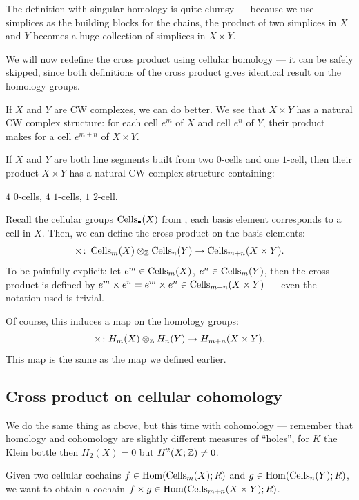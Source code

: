 The definition with singular homology is quite clumsy ---
because we use simplices as the building blocks for the chains,
the product of two simplices in $X$ and $Y$ becomes a huge collection of simplices in $X \times Y$.

We will now redefine the cross product using cellular homology ---
it can be safely skipped, since both definitions of the cross product gives identical result on the
homology groups.

If $X$ and $Y$ are CW complexes, we can do better.
We see that $X \times Y$ has a natural CW complex structure: for each cell $e^m$ of $X$ and cell
$e^n$ of $Y$, their product makes for a cell $e^{m + n}$ of $X \times Y$.

\begin{example}
	If $X$ and $Y$ are both line segments built from
	two $0$-cells and one $1$-cell, then their product $X \times Y$ has a natural CW complex
	structure containing:
	\begin{itemize}
		\ii $4$ $0$-cells,
		\ii $4$ $1$-cells,
		\ii $1$ $2$-cell.
	\end{itemize}
\end{example}

Recall the cellular groups $\operatorname{Cells}_\bullet(X)$ from , each basis element
corresponds to a cell in $X$.
Then, we can define the cross product on the basis elements:
\[ \times \colon \operatorname{Cells}_m(X) \otimes_\mathbb Z \operatorname{Cells}_n(Y) \to \operatorname{Cells}_{m + n}(X \times Y). \]
To be painfully explicit:
let $e^m \in \operatorname{Cells}_m(X)$, $e^n \in \operatorname{Cells}_m(Y)$, then the cross product is defined by $e^m \times
e^n = e^m \times e^n \in \operatorname{Cells}_{m + n}(X \times Y)$ --- even the notation used is trivial.

Of course, this induces a map on the homology groups:
\[ \times \colon H_m(X) \otimes_\mathbb Z H_n(Y) \to H_{m + n}(X \times Y). \]
This map is the same as the map we defined earlier.

\subsection{Cross product on cellular cohomology}

We do the same thing as above, but this time with cohomology --- remember that homology and
cohomology are slightly different measures of ``holes'', for $K$ the Klein bottle then $H_2(X) =
0$ but $H^2(X; \mathbb Z) \neq 0$.

Given two cellular cochains $f \in \operatorname{Hom}(\operatorname{Cells}_m(X); R)$ and
$g \in \operatorname{Hom}(\operatorname{Cells}_n(Y); R)$, we want to obtain a cochain $f
\times g \in \operatorname{Hom}(\operatorname{Cells}_{m + n}(X \times Y); R)$.

